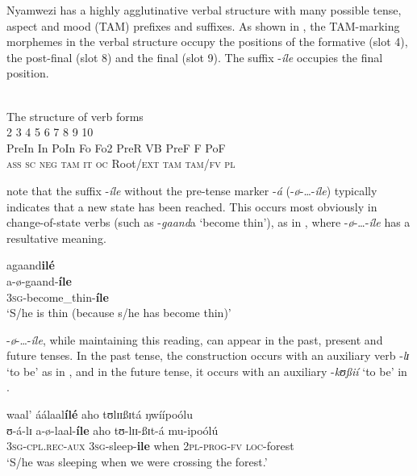 \documentclass[output=paper,newtxmath,modfonts,nonflat,draftmode]{langsci/langscibook}
\begin{document}
Nyamwezi has a highly agglutinative verbal structure with many possible tense, aspect and mood (TAM) prefixes and suffixes. As shown in , the TAM-marking morphemes in the verbal structure occupy the positions of the formative (slot 4), the post-final (slot 8) and the final (slot 9). The suffix -\textit{íle} occupies the final position. 

\ea \label{ex:kanijo:3}
\\
The structure of verb forms\\
  2  3  4  5  6  7  8  9  10\\
PreIn  In    PoIn      Fo     Fo2    PreR    VB     PreF     F        PoF\\
\textsc{ass} \textsc{sc} \textsc{neg}  \textsc{tam} \textsc{it} \textsc{oc}   Root/\textsc{ext} \textsc{tam}  \textsc{tam}/\textsc{fv}  \textsc{pl}\\
\z


\citet{Maganga1992} note that the suffix -\textit{íle} without the pre-tense marker -\textit{á} (-\textit{ø}-…-\textit{íle}) typically indicates that a new state has been reached. This occurs most obviously in change-of-state verbs (such as -\textit{gaand}a ‘become thin’), as in , where -\textit{ø}-…-\textit{íle} has a resultative meaning. 

\ea \label{ex:kanijo:4}
\glll agaand\textbf{ilé}\\
a-ø-gaand-\textbf{íle}\\
3\textsc{sg}-become\_thin-\textbf{íle}\\
\glt ‘S/he is thin (because s/he has become thin)’
\z

-\textit{ø}-\ldots-\textit{íle}, while maintaining this reading, can appear in the past, present and future tenses. In the past tense, the construction occurs with an auxiliary verb -\textit{l}{\textit{ɪ}} ‘to be’ as in , and in the future tense, it occurs with an auxiliary -\textit{kʊßií} ‘to be’ in . 

\ea \label{ex:kanijo:5}
\glll waal’    áálaal\textbf{ílé}   aho   tʊlɪɪßɪtá     ŋwíípoólu\\
ʊ-á-lɪ           a-ø-laal-\textbf{íle}     aho   tʊ-lɪɪ-ßɪt-á      mu-ipoólú\\
\textsc{3sg}-\textsc{cpl}.\textsc{rec}-\textsc{aux} \textsc{3sg}-sleep-\textbf{ile} when \textsc{2pl}-\textsc{prog}-\textsc{fv} \textsc{loc}-forest\\
\glt ‘S/he was sleeping when we were crossing the forest.’
\z
\end{document}
